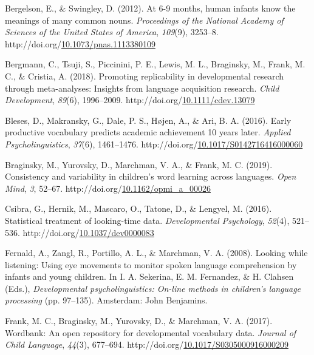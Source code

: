 \documentclass[10pt, letterpaper]{article}
\begin{document}
\hypertarget{refs}{}
\begin{CSLReferences}{1}{0}
\leavevmode\hypertarget{ref-Bergelson2012a}{}%
Bergelson, E., \& Swingley, D. (2012). {At 6-9 months, human infants
know the meanings of many common nouns.} \emph{Proceedings of the
National Academy of Sciences of the United States of America},
\emph{109}(9), 3253--8.
http://doi.org/\href{https://doi.org/10.1073/pnas.1113380109}{10.1073/pnas.1113380109}

\leavevmode\hypertarget{ref-Bergmann2018}{}%
Bergmann, C., Tsuji, S., Piccinini, P. E., Lewis, M. L., Braginsky, M.,
Frank, M. C., \& Cristia, A. (2018). {Promoting replicability in
developmental research through meta-analyses: Insights from language
acquisition research}. \emph{Child Development}, \emph{89}(6),
1996--2009.
http://doi.org/\href{https://doi.org/10.1111/cdev.13079}{10.1111/cdev.13079}

\leavevmode\hypertarget{ref-Bleses2016}{}%
Bleses, D., Makransky, G., Dale, P. S., Højen, A., \& Ari, B. A. (2016).
{Early productive vocabulary predicts academic achievement 10 years
later}. \emph{Applied Psycholinguistics}, \emph{37}(6), 1461--1476.
http://doi.org/\href{https://doi.org/10.1017/S0142716416000060}{10.1017/S0142716416000060}

\leavevmode\hypertarget{ref-Braginsky2019}{}%
Braginsky, M., Yurovsky, D., Marchman, V. A., \& Frank, M. C. (2019).
{Consistency and variability in children's word learning across
languages}. \emph{Open Mind}, \emph{3}, 52--67.
http://doi.org/\href{https://doi.org/10.1162/opmi_a_00026}{10.1162/opmi\_a\_00026}

\leavevmode\hypertarget{ref-Csibra2016}{}%
Csibra, G., Hernik, M., Mascaro, O., Tatone, D., \& Lengyel, M. (2016).
{Statistical treatment of looking-time data}. \emph{Developmental
Psychology}, \emph{52}(4), 521--536.
http://doi.org/\href{https://doi.org/10.1037/dev0000083}{10.1037/dev0000083}

\leavevmode\hypertarget{ref-Fernald2008}{}%
Fernald, A., Zangl, R., Portillo, A. L., \& Marchman, V. A. (2008).
{Looking while listening: Using eye movements to monitor spoken language
comprehension by infants and young children}. In I. A. Sekerina, E. M.
Fernandez, \& H. Clahsen (Eds.), \emph{Developmental psycholinguistics:
On-line methods in children's language processing} (pp. 97--135).
Amsterdam: John Benjamins.

\leavevmode\hypertarget{ref-Frank2016}{}%
Frank, M. C., Braginsky, M., Yurovsky, D., \& Marchman, V. A. (2017).
{Wordbank: An open repository for developmental vocabulary data}.
\emph{Journal of Child Language}, \emph{44}(3), 677--694.
http://doi.org/\href{https://doi.org/10.1017/S0305000916000209}{10.1017/S0305000916000209}


\end{CSLReferences}
\end{document}
